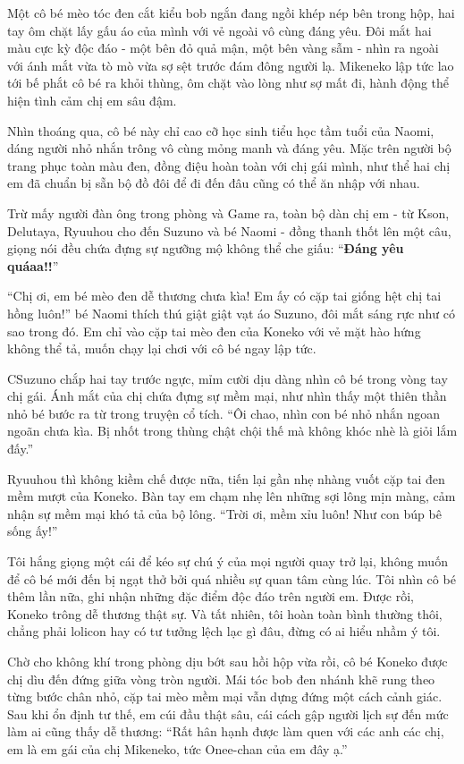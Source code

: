 ﻿\documentclass[../main.tex]{subfiles}
\begin{document}
Một cô bé mèo tóc đen cắt kiểu bob ngắn đang ngồi khép nép bên trong hộp, hai tay ôm chặt lấy gấu áo của mình với vẻ ngoài vô cùng đáng yêu. Đôi mắt hai màu cực kỳ độc đáo - một bên đỏ quả mận, một bên vàng sẫm - nhìn ra ngoài với ánh mắt vừa tò mò vừa sợ sệt trước đám đông người lạ. Mikeneko lập tức lao tới bế phắt cô bé ra khỏi thùng, ôm chặt vào lòng như sợ mất đi, hành động thể hiện tình cảm chị em sâu đậm.

Nhìn thoáng qua, cô bé này chỉ cao cỡ học sinh tiểu học tầm tuổi của Naomi, dáng người nhỏ nhắn trông vô cùng mỏng manh và đáng yêu. Mặc trên người bộ trang phục toàn màu đen, đồng điệu hoàn toàn với chị gái mình, như thể hai chị em đã chuẩn bị sẵn bộ đồ đôi để đi đến đâu cũng có thể ăn nhập với nhau.

Trừ mấy người đàn ông trong phòng và Game ra, toàn bộ dàn chị em - từ Kson, Delutaya, Ryuuhou cho đến Suzuno và bé Naomi - đồng thanh thốt lên một câu, giọng nói đều chứa đựng sự ngưỡng mộ không thể che giấu: ``\textbf{Đáng yêu quáaa!!}''

``Chị ơi, em bé mèo đen dễ thương chưa kìa! Em ấy có cặp tai giống hệt chị tai hồng luôn!'' bé Naomi thích thú giật giật vạt áo Suzuno, đôi mắt sáng rực như có sao trong đó. Em chỉ vào cặp tai mèo đen của Koneko với vẻ mặt hào hứng không thể tả, muốn chạy lại chơi với cô bé ngay lập tức.

CSuzuno chắp hai tay trước ngực, mỉm cười dịu dàng nhìn cô bé trong vòng tay chị gái. Ánh mắt của chị chứa đựng sự mềm mại, như nhìn thấy một thiên thần nhỏ bé bước ra từ trong truyện cổ tích. ``Ôi chao, nhìn con bé nhỏ nhắn ngoan ngoãn chưa kìa. Bị nhốt trong thùng chật chội thế mà không khóc nhè là giỏi lắm đấy.''

Ryuuhou thì không kiềm chế được nữa, tiến lại gần nhẹ nhàng vuốt cặp tai đen mềm mượt của Koneko. Bàn tay em chạm nhẹ lên những sợi lông mịn màng, cảm nhận sự mềm mại khó tả của bộ lông. ``Trời ơi, mềm xỉu luôn! Như con búp bê sống ấy!''

Tôi hắng giọng một cái để kéo sự chú ý của mọi người quay trở lại, không muốn để cô bé mới đến bị ngạt thở bởi quá nhiều sự quan tâm cùng lúc. Tôi nhìn cô bé thêm lần nữa, ghi nhận những đặc điểm độc đáo trên người em. Được rồi, Koneko trông dễ thương thật sự. Và tất nhiên, tôi hoàn toàn bình thường thôi, chẳng phải lolicon hay có tư tưởng lệch lạc gì đâu, đừng có ai hiểu nhầm ý tôi.

\ct

Chờ cho không khí trong phòng dịu bớt sau hồi hộp vừa rồi, cô bé Koneko được chị dìu đến đứng giữa vòng tròn người. Mái tóc bob đen nhánh khẽ rung theo từng bước chân nhỏ, cặp tai mèo mềm mại vẫn dựng đứng một cách cảnh giác. Sau khi ổn định tư thế, em cúi đầu thật sâu, cái cách gập người lịch sự đến mức làm ai cũng thấy dễ thương: ``Rất hân hạnh được làm quen với các anh các chị, em là em gái của chị Mikeneko, tức Onee-chan của em đây ạ.''
\end{document}

